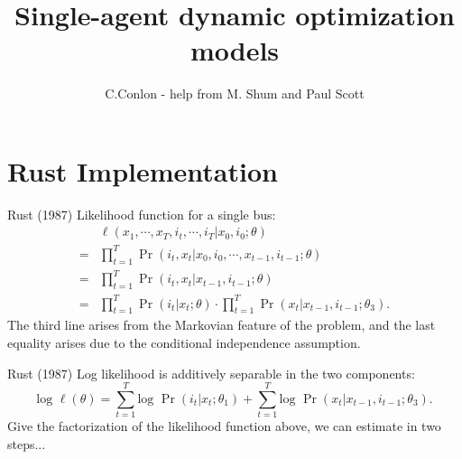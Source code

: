 \documentclass[aspectratio=169,11pt]{beamer}
\title [Single-agent dynamic optimization models]{Single-agent dynamic optimization models}
\author{C.Conlon - help from M. Shum and Paul Scott}
\institute{Grad IO }
\date{}
\begin{document}
\begin{frame}
\titlepage
\end{frame}

\section{Rust Implementation}

\begin{frame}{Rust (1987)}
Likelihood function for a single bus:
\begin{equation*}
\begin{split}
& \ell (x_1, \cdots , x_T, i_t, \cdots , i_T | x_0, i_0 ; \theta) \\
= & \prod^T_{t=1} \Pr(i_t, x_t | x_0, i_0, \cdots , x_{t-1}, i_{t-1} ; \theta) \\
= & \prod^T_{t=1} \Pr(i_t, x_t |  x_{t-1}, i_{t-1} ; \theta) \\
= & \prod^T_{t=1} \Pr(i_t | x_t; \theta) \cdot \prod^T_{t=1} \Pr (x_t | x_{t-1}, i_{t-1} ; \theta_3) .
\end{split}
\end{equation*}
The third line arises from the Markovian feature of the problem, and the last equality arises due to the conditional independence assumption. 
\end{frame}

\begin{frame}{Rust (1987)}
Log likelihood is additively separable in the two components:
\begin{equation*}
\text{log } \ell(\theta) = \sum^T_{t=1} \text{log } \Pr (i_t | x_t ; \theta_1) + \sum^T_{t=1} \text{log } \Pr (x_t | x_{t-1}, i_{t-1}; \theta_3).
\end{equation*}
Give the factorization of the likelihood function above, we can estimate in two steps... \\
\vspace{3mm}
\end{frame}
\end{document}
